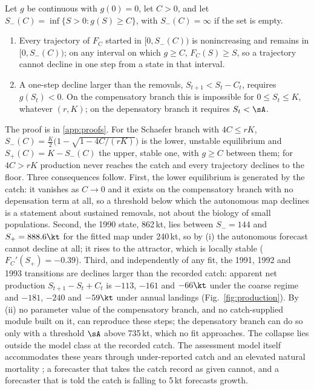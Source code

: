 \begin{proposition}\label{prop:repeller}
Let $g$ be continuous with $g(0)=0$, let $C>0$, and let $S_-(C) = \inf\{S>0 : g(S)\ge C\}$, with $S_-(C)=\infty$ if the set is empty.
\begin{enumerate}[label=(\roman*),leftmargin=2.2em,itemsep=1pt]
\item Every trajectory of $F_C$ started in $[0,S_-(C))$ is nonincreasing and remains in $[0,S_-(C))$; on any interval on which $g \ge C$, $F_C(S)\ge S$, so a trajectory cannot decline in one step from a state in that interval.
\item A one-step decline larger than the removals, $S_{t+1} < S_t - C_t$, requires $g(S_t) < 0$. On the compensatory branch this is impossible for $0\le S_t\le K$, whatever $(r,K)$; on the depensatory branch it requires $S_t < \sA$.
\end{enumerate}
\end{proposition}

The proof is in \ref{app:proofs}. For the Schaefer branch with $4C\le rK$, $S_-(C) = \tfrac{K}{2}\bigl(1-\sqrt{1-4C/(rK)}\bigr)$ is the lower, unstable equilibrium and $S_+(C)=K-S_-(C)$ the upper, stable one, with $g\ge C$ between them; for $4C>rK$ production never reaches the catch and every trajectory declines to the floor. Three consequences follow. First, the lower equilibrium is generated by the catch: it vanishes as $C\to 0$ and it exists on the compensatory branch with no depensation term at all, so a threshold below which the autonomous map declines is a statement about sustained removals, not about the biology of small populations. Second, the 1990 state, 862\,kt, lies between $S_-=144$ and $S_+=888.6\kt$ for the fitted map under 240\,kt, so by (i) the autonomous forecast cannot decline at all; it rises to the attractor, which is locally stable ($F_C'(S_+)=-0.39$). Third, and independently of any fit, the 1991, 1992 and 1993 transitions are declines larger than the recorded catch: apparent net production $S_{t+1}-S_t+C_t$ is $-113$, $-161$ and $-66\kt$ under the coarse regime and $-181$, $-240$ and $-59\kt$ under annual landings (Fig.~\ref{fig:production}). By (ii) no parameter value of the compensatory branch, and no catch-supplied module built on it, can reproduce these steps; the depensatory branch can do so only with a threshold $\sA$ above 735\,kt, which no fit approaches. The collapse lies outside the model class at the recorded catch. The assessment model itself accommodates these years through under-reported catch and an elevated natural mortality \citep{Cadigan2016}; a forecaster that takes the catch record as given cannot, and a forecaster that is told the catch is falling to 5\,kt forecasts growth.

